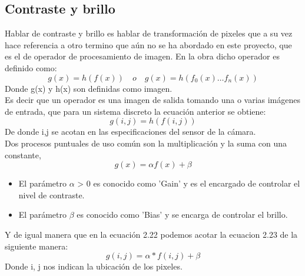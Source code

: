 
\subsection{Contraste y brillo}
Hablar de contraste y brillo es hablar de transformación de pixeles que a su vez hace referencia a otro termino que aún
no se ha abordado en este proyecto, que es el de operador de procesamiento de imagen. En la obra \cite{Book:Richard2011}
dicho operador es definido como:
\begin{equation}
	g(x) = h(f(x)) \quad o \quad g(x) = h(f_0(x) \dots f_n(x))
\end{equation}
Donde g(x) y h(x) son definidas como imagen.\\
Es decir que un operador es una imagen de salida tomando una o varias imágenes de entrada, que para un sistema discreto
la ecuación anterior se obtiene:
\begin{equation}
	g(i,j) = h(f(i,j))
\end{equation}
De donde i,j se acotan en las especificaciones del sensor de la cámara. \\Dos procesos puntuales de uso común
son la multiplicación y la suma con una constante,
\begin{equation}
	g(x) = \alpha f(x) + \beta
\end{equation}
\begin{itemize}
	\item El parámetro $\alpha$ > 0 es conocido como 'Gain' y es el encargado de controlar el nivel de contraste.
	\item El parámetro $\beta$ es conocido como 'Bias' y se encarga de controlar el brillo.
\end{itemize}
Y de igual manera que en la ecuación 2.22 podemos acotar la ecuacion 2.23 de la siguiente manera:
\begin{equation}
	g(i,j) = \alpha * f(i,j) + \beta
\end{equation}
Donde i, j nos indican la ubicación de los pixeles.